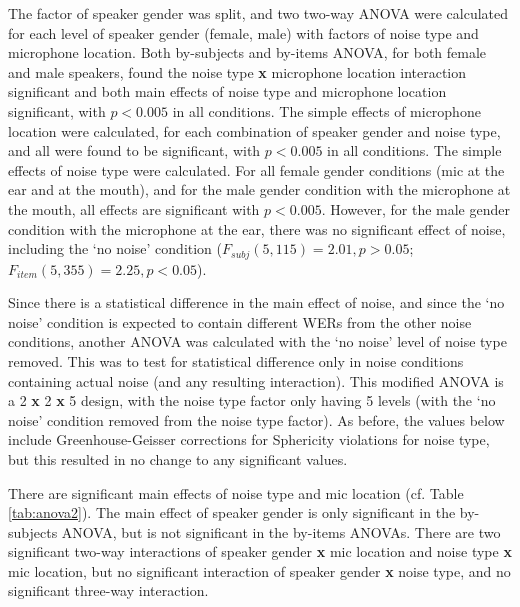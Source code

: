 The factor of speaker gender was split, and two two-way ANOVA were calculated for each level of speaker gender (female, male) with factors of noise type and microphone location.  Both by-subjects and by-items ANOVA, for both female and male speakers, found the noise type \textbf{x} microphone location interaction significant and both main effects of noise type and microphone location significant, with $p<0.005$ in all conditions.  The simple effects of microphone location were calculated, for each combination of speaker gender and noise type, and all were found to be significant, with $p<0.005$ in all conditions.  The simple effects of noise type were calculated.  For all female gender conditions (mic at the ear and at the mouth), and for the male gender condition with the microphone at the mouth, all effects are significant with $p<0.005$.  However, for the male gender condition with the microphone at the ear, there was no significant effect of noise, including the `no noise' condition ($F_{subj}(5,115)=2.01, p>0.05$; $F_{item}(5,355)=2.25, p<0.05$).

Since there is a statistical difference in the main effect of noise, and since the `no noise' condition is expected to contain different WERs from the other noise conditions, another ANOVA was calculated with the `no noise' level of noise type removed.  This was to test for statistical difference only in noise conditions containing actual noise (and any resulting interaction). This modified ANOVA is a 2 \textbf{x} 2 \textbf{x} 5 design, with the noise type factor only having 5 levels (with the `no noise' condition removed from the noise type factor).  As before, the values below include Greenhouse-Geisser corrections for Sphericity violations for noise type, but this resulted in no change to any significant values.

There are significant main effects of noise type and mic location (cf. Table \ref{tab:anova2}).  The main effect of speaker gender is only significant in the by-subjects ANOVA, but is not significant in the by-items ANOVAs.  There are two significant two-way interactions of speaker gender \textbf{x} mic location and noise type \textbf{x} mic location, but no significant interaction of speaker gender \textbf{x} noise type, and no significant three-way interaction.  

